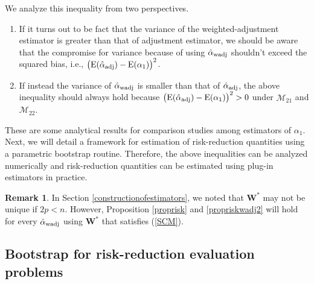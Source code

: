 \documentclass[11pt]{article}
\def\mrm#1{\mathrm{#1}} %
\def\mc#1{\mathcal{#1}} %
\def\E#1{\mathrm{E}(#1)} %
\theoremstyle{definition}
\newtheorem{remark}{Remark}
\begin{document}
We analyze this inequality from two perspectives. 
 \begin{enumerate}
   \item If it turns out to be fact that the variance of the weighted-adjustment estimator is greater than that of adjustment estimator, we should be aware that  the compromise for variance because of using $\hat{\alpha}_{\rm wadj}$ shouldn't exceed the squared bias, i.e., $\big(\E{\hat{\alpha}_{\rm adj}}-\mrm{E}(\alpha_1)\big)^2$.
   \item If instead the variance of $\hat{\alpha}_{\rm wadj}$ is smaller than that of $\hat{\alpha}_{\rm adj}$, the above inequality should always hold because $\big(\E{\hat{\alpha}_{\rm adj}}-\mrm{E}(\alpha_1)\big)^2>0$ under $\mc{M}_{21}$ and $\mc{M}_{22}$. 
 \end{enumerate}
  
 These are some analytical results for comparison studies among estimators of $\alpha_1$. Next, we will detail a framework for estimation of risk-reduction  quantities using a parametric bootstrap routine. Therefore, the above inequalities can be analyzed numerically and risk-reduction quantities can be estimated using plug-in estimators in practice.

\begin{remark}
  In Section \ref{constructionofestimators}, we noted that $\mathbf{W}^*$ may not be unique if $2p < n$. However, Proposition \ref{proprisk} and \ref{propriskwadj2} will hold for  every $\hat{\alpha}_{\rm wadj}$ using  $\mathbf{W}^*$ that satisfies (\ref{SCM}).
\end{remark}


\subsection{Bootstrap for risk-reduction evaluation problems}
\label{varbootstrap}
\end{document}
